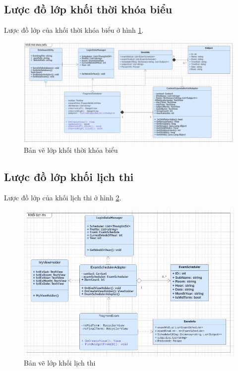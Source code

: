 \documentclass[a4paper]{article}
\begin{document}
\subsection{Lược đồ lớp khối thời khóa biểu}
Lược đồ lớp của khối thời khóa biểu ở hình \ref{fig:uml_scheduler}. 
\begin{figure}[H]
    \centering
    \includegraphics[scale = .4]{uml_scheduler.png}
    \caption{Bản vẽ lớp khối thời khóa biểu}
    \label{fig:uml_scheduler}
\end{figure}
\subsection{Lược đồ lớp khối lịch thi}
Lược đồ lớp của khối lịch thi ở hình \ref{fig:uml_exam}. 
\begin{figure}[H]
    \centering
    \includegraphics[scale = .5]{uml_exam.png}
    \caption{Bản vẽ lớp khối lịch thi}
    \label{fig:uml_exam}
\end{figure}
\end{document}

